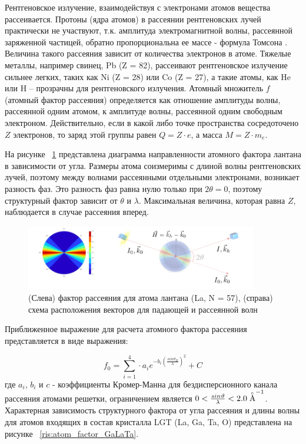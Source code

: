 
Рентгеновское излучение, взаимодействуя с электронами атомов вещества рассеивается.
Протоны (ядра атомов) в рассеянии рентгеновских лучей практически не участвуют, т.к.
амплитуда электромагнитной волны, рассеянной заряженной частицей,
 обратно пропорциональна ее массе - формула Томсона \cite{iveronova1972}. Величина такого рассеяния
 зависит от количества электронов в атоме.  Тяжелые металлы,
 например свинец, Pb (Z = 82), рассеивают рентгеновское излучение сильнее легких,
 таких как Ni (Z = 28) или  Co (Z = 27), а такие атомы, как He или H – прозрачны
 для рентгеновского излучения.  Атомный множитель $f$ (атомный фактор рассеяния) определяется
как отношение амплитуды волны, рассеянной одним атомом, к амплитуде волны, рассеянной
одним свободным электроном. Действительно, если в какой либо точке пространства сосредоточено
$Z$ электронов, то заряд этой группы равен $Q = Z\cdot e$, а масса $M = Z \cdot m_e$.

На рисунке ~\ref{ris:atom_factor} представлена диаграмма направленности атомного
фактора лантана в зависимости от угла. Размеры атома соизмеримы с длиной волны
рентгеновских лучей, поэтому между волнами рассеянными отдельными электронами, возникает
разность фаз. Это разность фаз равна нулю только при $2 \theta = 0$, поэтому структурный
фактор зависит от $\theta$ и $\lambda$. Максимальная величина, которая равна $Z$,
 наблюдается в случае рассеяния вперед.

\begin{figure}[H]
  \centering
  \includegraphics[width=0.9\textwidth]{images/atom_factor.png}
  \caption{ (Слева) фактор рассеяния для атома лантана (La, N = 57), (справа)
  схема расположения векторов для падающей и рассеянной волн}
  \label{ris:atom_factor}
\end{figure}

Приближенное выражение для расчета атомного фактора рассеяния
представляется \cite{International_Tables} в виде выражения:

\begin{equation}
  f_0 = \sum_{i=1}^{4} \cdot a_i e^{ -b_i (\frac{sin \vartheta_B}{\lambda})^2} + C
 \end{equation}
где $a_i$, $b_i$ и $c$ - коэффициенты Кромер-Манна для бездисперсионного канала рассеяния атомами решетки,
ограничением является $0<\frac{sin\vartheta}{\lambda}<2.0 \angstrom ^{-1}$.
 Характерная зависимость структурного фактора от угла рассеяния и длины волны
для атомов входящих в состав кристалла LGT (La, Ga, Ta, O) представлена на рисунке ~\ref{ris:atom_factor_GaLaTa}.

